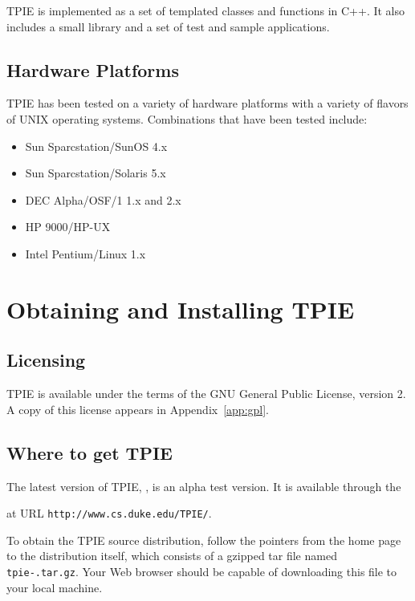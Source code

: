 TPIE is implemented as a set of templated classes and functions in
C++. It also includes a small library and a set of test and
sample applications.

\section{Hardware Platforms}

TPIE has been tested on a variety of hardware platforms with a variety
of flavors of UNIX operating systems.  Combinations that have been
tested include:
\begin{itemize}
\item Sun Sparcstation/SunOS 4.x 
\item Sun Sparcstation/Solaris 5.x
\item DEC Alpha/OSF/1 1.x and 2.x
\item HP 9000/HP-UX
\item Intel Pentium/Linux 1.x
\end{itemize}

\chapter{Obtaining and Installing TPIE}

\section{Licensing}

TPIE is available under the terms of the GNU General Public License,
version 2.  A copy of this license appears in Appendix~\ref{app:gpl}.

\section{Where to get TPIE}

The latest version of TPIE, \version, is an alpha test version.  It is
available through the %
\begin{latexonly}
at URL \verb|http://www.cs.duke.edu/TPIE/|.
\end{latexonly}

To obtain the TPIE source distribution, follow the
pointers from the home page to the distribution itself, which consists
of a gzipped tar file named {\tt tpie-\version.tar.gz}.  Your Web
browser should be capable of downloading this file to your local
machine.

